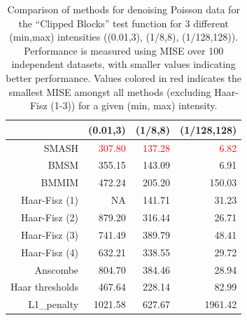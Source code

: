 \documentclass[12pt]{article}
\begin{document}
\begin{table}[ht]
\centering
\begin{tabular}{rrrr}
  \hline
 & (0.01,3) & (1/8,8) & (1/128,128) \\ 
  \hline
SMASH & \textcolor{red}{307.80} & \textcolor{red}{137.28} & \textcolor{red}{6.82} \\ 
  BMSM & 355.15 & 143.09 & 6.91 \\ 
  BMMIM & 472.24 & 205.20 & 150.03 \\ 
	Haar-Fisz (1) & NA & 141.71 & 31.23 \\
	Haar-Fisz (2) & 879.20 & 316.44 & 26.71 \\
	Haar-Fisz (3) & 741.49 & 389.79 & 48.41 \\	
	Haar-Fisz (4) & 632.21 & 338.55 & 29.72 \\ 
  Anscombe & 804.70 & 384.46 & 28.94 \\ 
  Haar thresholds & 467.64 & 228.14 & 82.99 \\ 
  L1\_penalty & 1021.58 & 627.67 & 1961.42 \\ 
   \hline
\end{tabular}
\caption{Comparison of methods for denoising Poisson data for the ``Clipped Blocks'' test function for 3 different (min,max) intensities ((0.01,3), (1/8,8), (1/128,128)). Performance is measured using MISE over 100 independent datasets, with smaller values indicating better performance. Values colored in red indicates the smallest MISE amongst all methods (excluding Haar-Fisz (1-3)) for a given (min, max) intensity.} 
\label{table:pois_cb}
\end{table}
\end{document}
